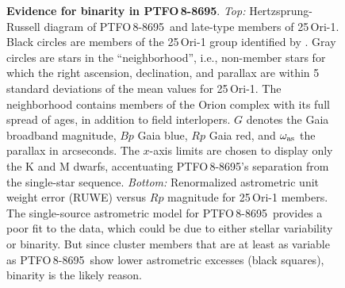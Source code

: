 \documentclass[12pt,twocolumn,tighten,trackchanges]{aastex62}
\newcommand{\ptfo}{PTFO$\,$8-8695}
\begin{document}
\begin{figure}[t]
	\begin{center}
		\leavevmode
		
		\vspace{-0.7cm}
	\end{center}
	\vspace{-0.7cm}
	\caption{ {\bf Evidence for binarity in \ptfo}.
    {\it Top:} Hertzsprung-Russell diagram of \ptfo\ and late-type
    members of 25$\,$Ori-1. Black circles are members of the
    25$\,$Ori-1 group identified by \citet{kounkel_apogee2_2018}.
    Gray circles are stars in the ``neighborhood'', i.e., non-member
    stars for which the right ascension, declination, and parallax are
    within 5 standard deviations of the mean values for 25$\,$Ori-1.
    The neighborhood contains members of the Orion complex with its
    full spread of ages, in addition to field interlopers.  $G$
    denotes the Gaia broadband magnitude, $Bp$ Gaia blue, $Rp$ Gaia
    red, and $\omega_{\rm as}$ the parallax in arcseconds.  The
    $x$-axis limits are chosen to display only the K and M dwarfs,
    accentuating \ptfo's separation from the single-star sequence.
    {\it Bottom:} Renormalized astrometric
    unit weight error (RUWE) versus $Rp$ magnitude
    for 25$\,$Ori-1 members.  The single-source astrometric model for
    \ptfo\ provides a poor fit to the data, which could be due to
    either stellar variability or binarity.  But since cluster members
    that are at least as variable as \ptfo\ show lower astrometric
    excesses (black squares), binarity is the likely reason.
		\label{fig:gaia}
	}
\end{figure}
\end{document}
